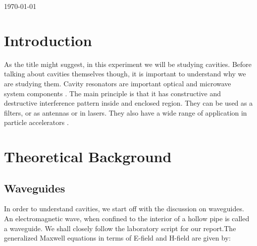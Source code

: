 \documentclass[a4paper]{report}
\numberwithin{equation}{section}
\begin{document}
\begin{titlepage}
	
	
	\vfill\vfill
	
	{\large\today} %
	
	
	 
	
	\vfill %
	
\end{titlepage}


\tableofcontents

\chapter{Introduction}
As the title might suggest, in this experiment we will be studying cavities. Before talking about cavities themselves though, it is important to understand why we are studying them. Cavity resonators are important optical and microwave system components \cite{Weng}. The main principle is that it has constructive and destructive interference pattern inside and enclosed region. They can be used as a filters, or as antennas or in lasers. They also have a wide range of application in particle accelerators \cite{accelerator}. \\



\chapter{Theoretical Background}

\section{Waveguides}
In order to understand cavities, we start off with the discussion on waveguides.
An electromagnetic wave, when confined to the interior of a hollow pipe is
called a waveguide. We shall closely follow the laboratory script \cite{Hillert} for our report.The
generalized Maxwell equations in terms of E-field and H-field are given by:
\end{document}
